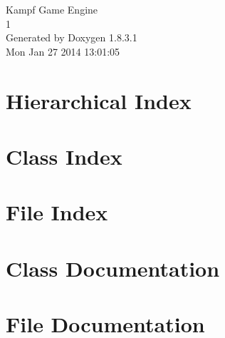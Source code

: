 \documentclass{book}
\begin{document}
\hypersetup{pageanchor=false,citecolor=blue}
\begin{titlepage}
\vspace*{7cm}
\begin{center}
{\Large Kampf Game Engine \\[1ex]\large 1 }\\
\vspace*{1cm}
{\large Generated by Doxygen 1.8.3.1}\\
\vspace*{0.5cm}
{\small Mon Jan 27 2014 13:01:05}\\
\end{center}
\end{titlepage}
\clearemptydoublepage
{}
\tableofcontents
\clearemptydoublepage
{}
\hypersetup{pageanchor=true,citecolor=blue}
\chapter{Hierarchical Index}

\chapter{Class Index}

\chapter{File Index}

\chapter{Class Documentation}
































\chapter{File Documentation}

\printindex
\end{document}
